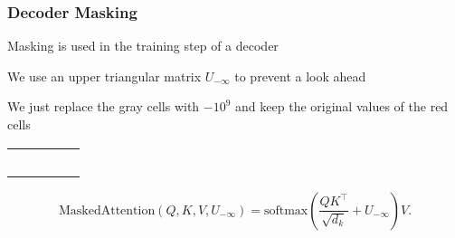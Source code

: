 \begin{frame}[fragile]
\frametitle{Decoder Masking}\color{structure}
Masking is used in the training step of a decoder

We use an upper triangular matrix $U_{-\infty}$ to prevent a look ahead

We just replace the gray cells with $-10^9$ and keep the original values of the red cells

\begin{center}
\begin{tabular}{ccccc}
\cellcolor{red}&\cellcolor{lightgray}&\cellcolor{lightgray}&\cellcolor{lightgray}&\cellcolor{lightgray}\\
\cellcolor{red}&\cellcolor{red}&\cellcolor{lightgray}&\cellcolor{lightgray}&\cellcolor{lightgray}\\
\cellcolor{red}&\cellcolor{red}&\cellcolor{red}&\cellcolor{lightgray}&\cellcolor{lightgray}\\
\cellcolor{red}&\cellcolor{red}&\cellcolor{red}&\cellcolor{red}&\cellcolor{lightgray}\\
\cellcolor{red}&\cellcolor{red}&\cellcolor{red}&\cellcolor{red}&\cellcolor{red}\\
\end{tabular}
\end{center}

\[
\text{MaskedAttention}(Q, K, V, U_{-\infty}) = \text{softmax}\left (\frac{QK^\intercal}{\sqrt{d_k}} + U_{-\infty}\right ) V.
\]
\end{frame}

